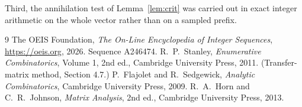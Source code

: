 \documentclass[11pt,a4paper]{article}
\theoremstyle{plain}
\theoremstyle{definition}
\begin{document}
Third, the annihilation test of Lemma~\ref{lem:crit} was carried out in exact integer
arithmetic on the whole vector rather than on a sampled prefix.

\begin{thebibliography}{9}
 The OEIS Foundation, \emph{The On-Line Encyclopedia of Integer
Sequences}, \url{https://oeis.org}, 2026. Sequence A246474.
 R.~P.~Stanley, \emph{Enumerative Combinatorics}, Volume 1, 2nd ed.,
Cambridge University Press, 2011. (Transfer-matrix method, Section 4.7.)
 P.~Flajolet and R.~Sedgewick, \emph{Analytic Combinatorics}, Cambridge
University Press, 2009.
 R.~A.~Horn and C.~R.~Johnson, \emph{Matrix Analysis}, 2nd ed., Cambridge
University Press, 2013.
\end{thebibliography}
\end{document}
